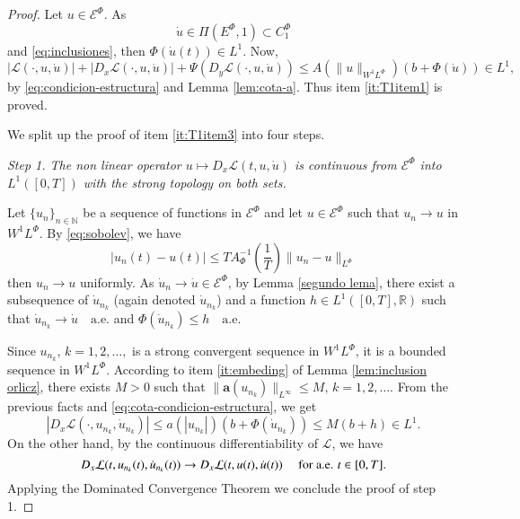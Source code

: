 \documentclass[twoside]{article}
\theoremstyle{remark}
\newcommand{\orlnor}{\|_{L^{\Phi}}}
\newcommand{\lphi}{L^{\Phi}}
\newcommand{\ephi}{E^{\Phi}}
\newcommand{\claseor}{C^{\Phi}}
\newcommand{\wphi}{W^{1}\lphi}
\newcommand{\sobnor}{\|_{W^{1}\lphi}}
\newcommand{\domi}{\mathcal{E}^{\Phi}}
\renewcommand{\b}[1]{\boldsymbol{#1}}
\newcommand{\rr}{\mathbb{R}}
\renewcommand{\leq}{\leqslant}
\begin{document}
\begin{proof}
Let $u\in \domi$.
As 
\begin{equation}\label{eq:inclusion3}
\dot{u}\in\Pi(\ephi,1)\subset \claseor_1
\end{equation}
and \eqref{eq:inclusiones}, then $\Phi( \dot{u}(t)) \in L^1$.
Now,
 \begin{equation}\label{eq:cota-condicion-estructura}
|\mathcal{L}(\cdot,u,\dot{u})|+ |D_{x}\mathcal{L}(\cdot,u,\dot{u})|
+\Psi(D_{y}\mathcal{L}(\cdot,u,\dot{u}))
\leq A(\|u\sobnor ) (b+ \Phi (\dot{u})) \in
 L^1,
\end{equation}
by  \eqref{eq:condicion-estructura} and Lemma \ref{lem:cota-a}.
Thus item \eqref{it:T1item1} is proved.

We split up the proof of item \ref{it:T1item3} into four steps.

\noindent\emph{Step 1. The non linear operator  $u \mapsto D_{x}\mathcal{L}(t,u,\dot{u})$ is continuous from $\domi$ into $L^{1}([0,T])$ with the strong topology on both sets.} 




Let   $\{u_n\}_{n\in \mathbb{N}}$ be a sequence of  functions in $\domi$  
and let $u\in \domi$  such that $u_n\rightarrow u$ in $\wphi$.
By \eqref{eq:sobolev}, we have 
\[
|u_n(t)-u(t)|\leq T A_{\Phi}^{-1}\left(\frac{1}{T}\right) \|u_n-u\orlnor
\]
then $u_n \to u$ uniformly.
As $\dot{u}_n\rightarrow \dot{u}\in\domi$, by 
  Lemma \ref{segundo lema}, there exist a subsequence of  $\dot{u}_{n_k}$ (again denoted $\dot{u}_{n_k}$) and a function  
	$h\in L^1([0,T],\rr)$
	such that  $\dot{u}_{n_k}\rightarrow \dot{u} \quad\text{a.e.}$ and $\Phi(\dot{u}_{n_k})\leq h\quad\text{a.e}$.  

Since $u_{n_k}$, $k=1,2,\ldots,$ is a strong convergent sequence in $\wphi$, it is a bounded sequence in $\wphi$. 
According to item \eqref{it:embeding} of   Lemma \ref{lem:inclusion orlicz}, 
there exists $M>0$ such that $\|\b{a}(u_{n_k})\|_{L^{\infty}} \leq M$, $k=1,2,\ldots$.  
From the previous facts and \eqref{eq:cota-condicion-estructura}, we get
\begin{equation*}\label{eq:DxL1-bis}
|D_{x}\mathcal{L}(\cdot,u_{n_k},\dot{u}_{n_k})|\leq a(|u_{n_k}|)(b+\Phi(\dot{u}_{n_k}))\leq
M (b+h) \in L^1.
\end{equation*}
On the other hand, by the continuous differentiability of $\mathcal{L}$, we have
\[D_{x}\mathcal{L}(t,u_{n_k}(t),\dot{u}_{n_k}(t))\to D_{x}\mathcal{L}(t,u(t),\dot{u}(t))\quad\hbox{ for a.e. } t\in[0,T].\]
Applying the Dominated Convergence Theorem we conclude the proof of step 1.



\end{proof}
\end{document}
